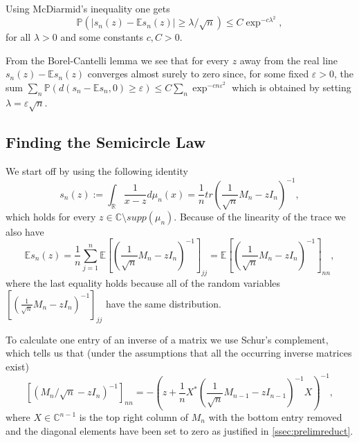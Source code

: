 Using McDiarmid's inequality one gets $$\mathbb P(|s_n(z)-\mathbb Es_n(z)|\geq\lambda/\sqrt n)\leq C\exp^{-c\lambda^2},$$ for all $\lambda>0$ and some constants $c,C>0$.

From the Borel-Cantelli lemma we see that for every $z$ away from the real line $s_n(z)-\mathbb Es_n(z)$ converges almost surely to zero since, for some fixed $\varepsilon>0$, the sum $\sum_n \mathbb P(d(s_n-\mathbb Es_n,0)\geq\varepsilon) \leq C\sum_n\exp^{-cn\varepsilon^2}$ which is obtained by setting $\lambda=\varepsilon\sqrt n$.

\subsection{Finding the Semicircle Law}

We start off by using the following identity $$s_n(z) := \int_\mathbb{R}\frac{1}{x-z}d\mu_n(x) = \frac{1}{n}tr\left(\frac{1}{\sqrt n}M_n-zI_n\right)^{-1},$$ which holds for every $z\in\mathbb C\setminus supp(\mu_n)$. Because of the linearity of the trace we also have $$\mathbb Es_n(z) = \frac{1}{n}\sum_{j=1}^n\mathbb E\left[\left(\frac{1}{\sqrt n}M_n-zI_n\right)^{-1}\right]_{jj}=\mathbb E\left[\left(\frac{1}{\sqrt n}M_n-zI_n\right)^{-1}\right]_{nn},$$ where the last equality holds because all of the random variables $\left[\left(\frac{1}{\sqrt n}M_n-zI_n\right)^{-1}\right]_{jj}$ have the same distribution.

To calculate one entry of an inverse of a matrix we use Schur's complement, which tells us that (under the assumptions that all the occurring inverse matrices exist) $$[(M_n/\sqrt n-zI_n)^{-1}]_{nn}=-\left(z+\frac{1}{n}X^*(\frac{1}{\sqrt n}M_{n-1}-zI_{n-1})^{-1}X\right)^{-1},$$ where $X\in\mathbb C^{n-1}$ is the top right column of $M_n$ with the bottom entry removed and the diagonal elements have been set to zero as justified in \ref{ssec:prelimreduct}.















